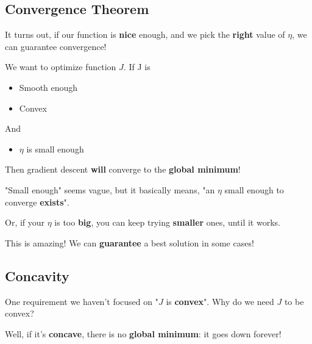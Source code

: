     \subsection{Convergence Theorem}
    
        It turns out, if our function is \textbf{nice} enough, and we pick the \textbf{right} value of $\eta$, we can guarantee convergence!\\
        
        \begin{theorem}
            We want to optimize function $J$. If J is 
            \begin{itemize}
                \item Smooth enough
                \item Convex
            \end{itemize}
            
            And
            
            \begin{itemize}
                \item $\eta$ is small enough
            \end{itemize}
            
            Then gradient descent \textbf{will} converge to the \textbf{global minimum}!
        \end{theorem}
        
        "Small enough" seems vague, but it basically means, "an $\eta$ small enough to converge \textbf{exists}". 
        
        Or, if your $\eta$ is too \textbf{big}, you can keep trying \textbf{smaller} ones, until it works. 
        
        This is amazing! We can \textbf{guarantee} a best solution in some cases!
        
    \subsection{Concavity}
    
        One requirement we haven't focused on "$J$ is \textbf{convex}". Why do we need $J$ to be convex?
        
        Well, if it's \textbf{concave}, there is no \textbf{global minimum}: it goes down forever!\\
        

